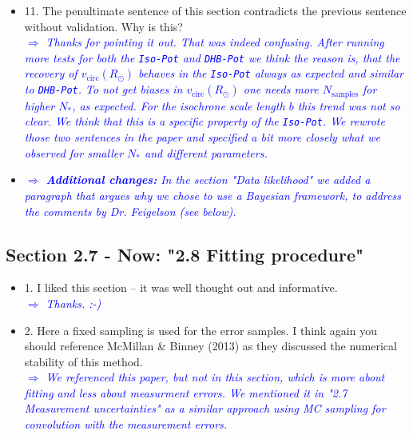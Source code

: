 \documentclass[10pt,a4paper]{article}
\newcommand{\Comment}[1]{\textsl{\textcolor{Blue}{$\Longrightarrow$ {#1}}}}
\begin{document}
\begin{itemize}
\item 11. The penultimate sentence of this section contradicts the previous sentence without validation. Why is this? \\\Comment{Thanks for pointing it out. That was indeed confusing. After running more tests for both the \texttt{Iso-Pot} and \texttt{DHB-Pot} we think the reason is, that the recovery of $v_\text{circ}(R_\odot)$ behaves in the \texttt{Iso-Pot} always as expected and similar to \texttt{DHB-Pot}. To not get biases in $v_\text{circ}(R_\odot)$ one needs more $N_\text{samples}$ for higher $N_*$, as expected. For the isochrone scale length $b$ this trend was not so clear. We think that this is a specific property of the \texttt{Iso-Pot}. We rewrote those two sentences in the paper and specified a bit more closely what we observed for smaller $N_*$ and different parameters.}
\item \Comment{\textbf{Additional changes:} In the section "Data likelihood" we added a paragraph that argues why we chose to use a Bayesian framework, to address the comments by Dr. Feigelson (see below).}
\end{itemize}

\subsection{Section 2.7 - Now: "2.8 Fitting procedure"}
\begin{itemize}
\item 1. I liked this section -- it was well thought out and informative. \\\Comment{Thanks. :-)}
\item 2. Here a fixed sampling is used for the error samples. I think again you should reference McMillan \& Binney (2013) as they discussed the numerical stability of this method. \\\Comment{We referenced this paper, but not in this section, which is more about fitting and less about measurment errors. We mentioned it in "2.7 Measurement uncertainties" as a similar approach using MC sampling for convolution with the measurement errors.}
\end{itemize}
\end{document}
